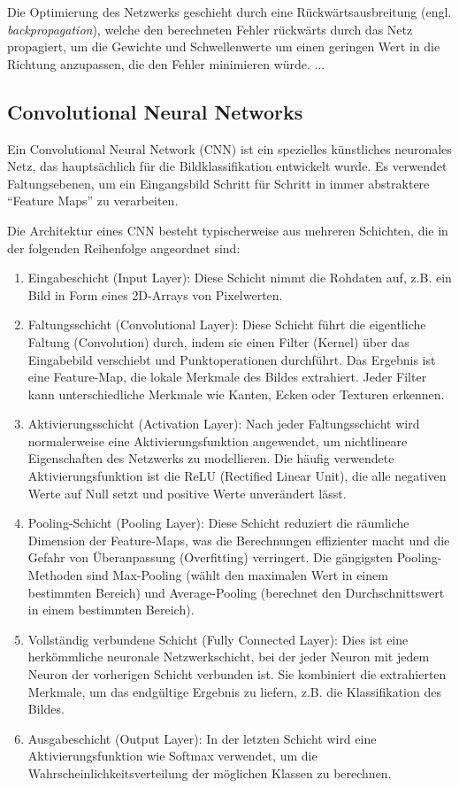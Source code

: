 Die Optimierung des Netzwerks geschieht durch eine Rückwärtsausbreitung (engl. \textit{backpropagation}), welche den berechneten Fehler rückwärts durch das Netz propagiert, um die Gewichte und Schwellenwerte um einen geringen Wert in die Richtung anzupassen, die den Fehler minimieren würde. ...

\subsection{Convolutional Neural Networks}

Ein Convolutional Neural Network (CNN) ist ein spezielles künstliches neuronales Netz, das hauptsächlich für die Bildklassifikation entwickelt wurde. Es verwendet Faltungsebenen, um ein Eingangsbild Schritt für Schritt in immer abstraktere “Feature Maps” zu verarbeiten.

Die Architektur eines CNN besteht typischerweise aus mehreren Schichten, die in der folgenden Reihenfolge angeordnet sind:

\begin{enumerate}[]
	\item Eingabeschicht (Input Layer): Diese Schicht nimmt die Rohdaten auf, z.B. ein Bild in Form eines 2D-Arrays von Pixelwerten.
	\item Faltungsschicht (Convolutional Layer): Diese Schicht führt die eigentliche Faltung (Convolution) durch, indem sie einen Filter (Kernel) über das Eingabebild verschiebt und Punktoperationen durchführt. Das Ergebnis ist eine Feature-Map, die lokale Merkmale des Bildes extrahiert. Jeder Filter kann unterschiedliche Merkmale wie Kanten, Ecken oder Texturen erkennen.
	\item Aktivierungsschicht (Activation Layer): Nach jeder Faltungsschicht wird normalerweise eine Aktivierungsfunktion angewendet, um nichtlineare Eigenschaften des Netzwerks zu modellieren. Die häufig verwendete Aktivierungsfunktion ist die ReLU (Rectified Linear Unit), die alle negativen Werte auf Null setzt und positive Werte unverändert lässt.
	\item Pooling-Schicht (Pooling Layer): Diese Schicht reduziert die räumliche Dimension der Feature-Maps, was die Berechnungen effizienter macht und die Gefahr von Überanpassung (Overfitting) verringert. Die gängigsten Pooling-Methoden sind Max-Pooling (wählt den maximalen Wert in einem bestimmten Bereich) und Average-Pooling (berechnet den Durchschnittswert in einem bestimmten Bereich).
	\item Vollständig verbundene Schicht (Fully Connected Layer): Dies ist eine herkömmliche neuronale Netzwerkschicht, bei der jeder Neuron mit jedem Neuron der vorherigen Schicht verbunden ist. Sie kombiniert die extrahierten Merkmale, um das endgültige Ergebnis zu liefern, z.B. die Klassifikation des Bildes.
	\item Ausgabeschicht (Output Layer): In der letzten Schicht wird eine Aktivierungsfunktion wie Softmax verwendet, um die Wahrscheinlichkeitsverteilung der möglichen Klassen zu berechnen.
\end{enumerate}

